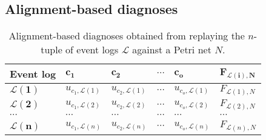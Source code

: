 \subsection{Alignment-based  diagnoses}
\begin{table}[!t]
\centering
\caption{Alignment-based  diagnoses obtained from replaying the $n$-tuple of event logs $\mathcal{L}$ against a Petri net $N$.}
\label{tab:CC_DIAGNOSES}
\begin{tabular}{llllll}
\hline
\textbf{Event log}            & $\boldsymbol{c_1}$       & $\boldsymbol{c_2}$       & $\cdots$ & $\boldsymbol{c_o}$       & $\boldsymbol{F_{\mathcal{L}(i),N}}$ \\ \hline
$\boldsymbol{\mathcal{L}(1)}$ & $u_{c_1,\mathcal{L}(1)}$ & $u_{c_2,\mathcal{L}(1)}$ & $\cdots$ & $u_{c_o,\mathcal{L}(1)}$ & $F_{\mathcal{L}(1),N}$              \\
$\boldsymbol{\mathcal{L}(2)}$ & $u_{c_1,\mathcal{L}(2)}$ & $u_{c_2,\mathcal{L}(2)}$ & $\cdots$ & $u_{c_o,\mathcal{L}(2)}$ & $F_{\mathcal{L}(2),N}$              \\
$\cdots$                      & $\cdots$                 & $\cdots$                 & $\cdots$ & $\cdots$                 & $\cdots$                            \\
$\boldsymbol{\mathcal{L}(n)}$ & $u_{c_1,\mathcal{L}(n)}$ & $u_{c_2,\mathcal{L}(n)}$ & $\cdots$ & $u_{c_o,\mathcal{L}(n)}$ & $F_{\mathcal{L}(n),N}$              \\ \hline
\end{tabular}
\end{table}


